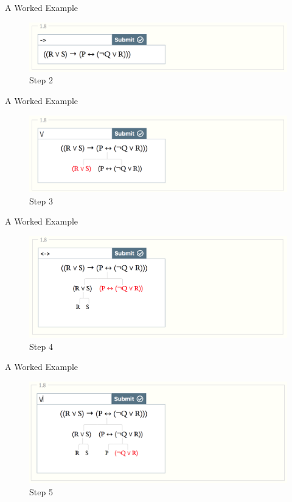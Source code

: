 \documentclass[
  ignorenonframetext,
]{beamer}
\renewcommand{\,}{\text{, }}
\begin{document}
\begin{frame}{A Worked Example}
\protect\hypertarget{a-worked-example-1}{}
\begin{figure}
\centering
\includegraphics{../images/class2_3/2.png}
\caption{Step 2}
\end{figure}
\end{frame}

\begin{frame}{A Worked Example}
\protect\hypertarget{a-worked-example-2}{}
\begin{figure}
\centering
\includegraphics{../images/class2_3/3.png}
\caption{Step 3}
\end{figure}
\end{frame}

\begin{frame}{A Worked Example}
\protect\hypertarget{a-worked-example-3}{}
\begin{figure}
\centering
\includegraphics{../images/class2_3/4.png}
\caption{Step 4}
\end{figure}
\end{frame}

\begin{frame}{A Worked Example}
\protect\hypertarget{a-worked-example-4}{}
\begin{figure}
\centering
\includegraphics{../images/class2_3/5.png}
\caption{Step 5}
\end{figure}
\end{frame}
\end{document}
